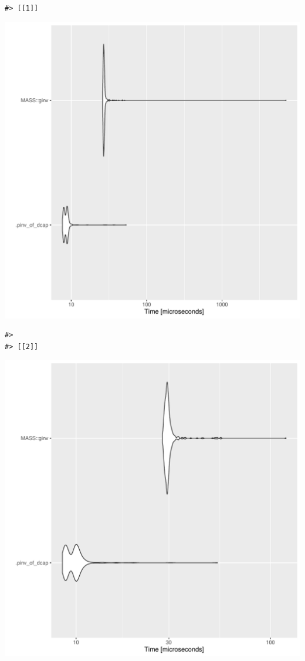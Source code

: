 \documentclass{article}\usepackage[]{graphicx}\usepackage[]{color}
\makeatletter
\newenvironment{kframe}{%
 \def\at@end@of@kframe{}%
 \ifinner\ifhmode%
  \def\at@end@of@kframe{\end{minipage}}%
  \begin{minipage}{\columnwidth}%
 \fi\fi%
 \def\FrameCommand##1{\hskip\@totalleftmargin \hskip-\fboxsep
 \colorbox{shadecolor}{##1}\hskip-\fboxsep
     \hskip-\linewidth \hskip-\@totalleftmargin \hskip\columnwidth}%
 \MakeFramed {\advance\hsize-\width
   \@totalleftmargin\z@ \linewidth\hsize
   \@setminipage}}%
 {\par\unskip\endMakeFramed%
 \at@end@of@kframe}
\newenvironment{knitrout}{}{} %
\makeatother
\begin{document}
\begin{knitrout}
\begin{kframe}
{\ttfamily\noindent\itshape\color{messagecolor}{\#> Coordinate system already present. Adding new coordinate system, which will replace the existing one.}}\begin{verbatim}
#> [[1]]
\end{verbatim}
\end{kframe}
\includegraphics[width=1\linewidth]{man/figures/latex-test-benchmark-linearAlgebra-pinv-of-dcap-dot-1} 
\begin{kframe}\begin{verbatim}
#> 
#> [[2]]
\end{verbatim}
\end{kframe}
\includegraphics[width=1\linewidth]{man/figures/latex-test-benchmark-linearAlgebra-pinv-of-dcap-dot-2} 

\end{knitrout}
\end{document}
